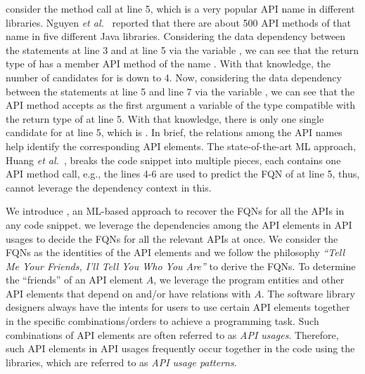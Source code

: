 consider the method call  at line 5, which is a very
popular API name in different libraries. Nguyen {\em et
  al.}~\cite{icse18} reported that there are about 500 API methods of
that name in five different Java libraries. Considering the data
dependency between the statements at line 3 and at line 5 via the
variable , we can see that the return type of
 has a member API method of the name .
With that knowledge, the number of candidates for  is
down to 4. Now, considering the data dependency between the statements
at line 5 and line 7 via the variable , we can see that the
API method  accepts as the first argument a
variable of the type compatible with the return type of 
at line 5. With that knowledge, there is only one single candidate for
 at line 5, which is
.
In brief, the relations among the API names help identify the
corresponding API elements. The state-of-the-art ML approach, Huang
{\em et al.}~\cite{prompt-ase22}, breaks the code snippet into
multiple pieces, each contains one API method call, e.g., the lines
4-6 are used to predict the FQN of  at line 5, thus,
cannot leverage the dependency context in this.

We introduce {\tool}, an ML-based approach to recover the FQNs for all
the APIs in any code snippet.
we leverage the dependencies among the API elements in
API usages to decide the FQNs for all the relevant APIs at once. We
consider the FQNs as the identities of the API elements and we follow
the philosophy {\em ``Tell Me Your Friends, I'll Tell You Who You
  Are''} to derive the FQNs. To determine the ``friends'' of an API
element $A$, we leverage the program entities and other API elements
that depend on and/or have relations with $A$. The software library
designers always have the intents for users to use certain API
elements together in the specific combinations/orders to achieve a
programming task. Such combinations of API elements are often referred
to as {\em API usages}. Therefore, such API elements in API usages
frequently occur together in the code using the libraries, which are
referred to as {\em API usage patterns}.

